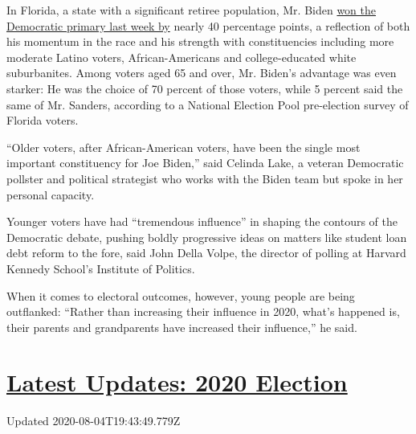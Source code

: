In Florida, a state with a significant retiree population, Mr. Biden
\href{https://www.nytimes3xbfgragh.onion/interactive/2020/03/17/us/elections/results-florida-president-democrat-primary-election.html}{won
the Democratic primary last week by} nearly 40 percentage points, a
reflection of both his momentum in the race and his strength with
constituencies including more moderate Latino voters, African-Americans
and college-educated white suburbanites. Among voters aged 65 and over,
Mr. Biden's advantage was even starker: He was the choice of 70 percent
of those voters, while 5 percent said the same of Mr. Sanders, according
to a National Election Pool pre-election survey of Florida voters.

``Older voters, after African-American voters, have been the single most
important constituency for Joe Biden,'' said Celinda Lake, a veteran
Democratic pollster and political strategist who works with the Biden
team but spoke in her personal capacity.

Younger voters have had ``tremendous influence'' in shaping the contours
of the Democratic debate, pushing boldly progressive ideas on matters
like student loan debt reform to the fore, said John Della Volpe, the
director of polling at Harvard Kennedy School's Institute of Politics.

When it comes to electoral outcomes, however, young people are being
outflanked: ``Rather than increasing their influence in 2020, what's
happened is, their parents and grandparents have increased their
influence,'' he said.

\hypertarget{latest-updates-2020-election}{%
\section{\texorpdfstring{\href{https://www.nytimes3xbfgragh.onion/2020/08/04/us/elections/primary-election-michigan-arizona-kansas.html?action=click\&pgtype=Article\&state=default\&region=MAIN_CONTENT_1\&context=storylines_live_updates}{Latest
Updates: 2020
Election}}{Latest Updates: 2020 Election}}\label{latest-updates-2020-election}}

Updated 2020-08-04T19:43:49.779Z


